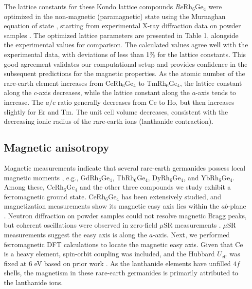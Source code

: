\documentclass[preprint,12pt]{elsarticle}
\begin{document}
The lattice constants for these Kondo lattice compounds $Re$Rh$_6$Ge$_4$ were optimized in the non-magnetic (paramagnetic) state using the Murnaghan equation of state \cite{murnaghan1944compressibility}, starting from experimental X-ray diffraction data on powder samples \cite{vosswinkel2013new}. The optimized lattice parameters are presented in Table 1, alongside the experimental values for comparison. The calculated values agree well with the experimental data, with deviations of less than 1\% for the lattice constants. This good agreement validates our computational setup and provides confidence in the subsequent predictions for the magnetic properties. As the atomic number of the rare-earth element increases from CeRh$_6$Ge$_4$ to TmRh$_6$Ge$_4$, the lattice constant along the $c$-axis decreases, while the lattice constant along the $a$-axis tends to increase. The $a/c$ ratio generally decreases from Ce to Ho, but then increases slightly for Er and Tm. The unit cell volume decreases, consistent with the decreasing ionic radius of the rare-earth ions (lanthanide contraction).

\subsection{Magnetic anisotropy}

Magnetic measurements indicate that several rare-earth germanides possess local magnetic moments \cite{vosswinkel2013new}, e.g., GdRh$_6$Ge$_4$, TbRh$_6$Ge$_4$, DyRh$_6$Ge$_4$, and YbRh$_6$Ge$_4$. Among these, CeRh$_6$Ge$_4$ and the other three compounds we study exhibit a ferromagnetic ground state. CeRh$_6$Ge$_4$ has been extensively studied, and magnetization measurements show its magnetic easy axis lies within the $ab$-plane \cite{shen2020strange}. Neutron diffraction on powder samples could not resolve magnetic Bragg peaks, but coherent oscillations were observed in zero-field $\mu$SR measurements \cite{shu2021magnetic}. $\mu$SR measurements suggest the easy axis is along the $a$-axis. Next, we performed ferromagnetic DFT calculations to locate the magnetic easy axis. Given that Ce is a heavy element, spin-orbit coupling was included, and the Hubbard $U_{\text{eff}}$ was fixed at $6$ eV based on prior work \cite{wu2021anisotropic, wang2021localized}. As the lanthanide elements have unfilled $4f$ shells, the magnetism in these rare-earth germanides is primarily attributed to the lanthanide ions.
\end{document}
